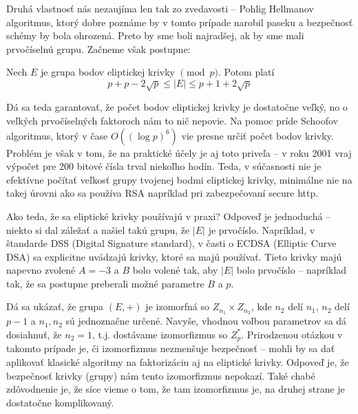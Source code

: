 Druhá vlastnosť nás nezaujíma len tak zo zvedavosti -- Pohlig Hellmanov
algoritmus, ktorý dobre poznáme by v tomto prípade narobil paseku a
bezpečnosť schémy by bola ohrozená. Preto by sme boli najradšej, ak by
sme mali prvočíselnú grupu. Začneme však postupne:

\begin{veta}
    Nech $E$ je grupa bodov eliptickej krivky $\pmod{p}$.
    Potom platí
    \begin{equation*}
        p+p - 2 \sqrt{p} \le |E| \le p + 1 + 2 \sqrt{p}
    \end{equation*}
\end{veta}

Dá sa teda garantovať, že počet bodov eliptickej krivky je dostatočne
veľký, no o veľkých prvočíselných faktoroch nám to nič nepovie.
Na pomoc príde Schoofov algoritmus, ktorý v čase
$O((\log{p})^6)$ vie presne určiť počet bodov krivky. Problém je však
v tom, že na praktické účely je aj toto priveľa -- v roku 2001 vraj
výpočet pre 200 bitové čísla trval niekoľho hodín. Teda, v súčasnosti
nie je efektívne počítať veľkosť grupy tvojenej bodmi eliptickej
krivky, minimálne nie na takej úrovni ako sa používa RSA napríklad pri
zabezpečovaní secure http.

Ako teda, že sa eliptické krivky používajú v praxi? Odpoveď je
jednoduchá -- niekto si dal záležať a našiel takú grupu, že $|E|$ je
prvočíslo. Napríklad, v štandarde DSS (Digital Signature standard), v
časti o ECDSA (Elliptic Curve DSA) sa explicitne uvádzajú krivky,
ktoré sa majú používať. Tieto krivky majú napevno zvolené $A=-3$ a $B$
bolo volené tak, aby $|E|$ bolo prvočíslo -- napríklad tak, že sa
postupne preberali možné parametre $B$ a $p$.

\begin{poznamka}
    Dá sa ukázať, že grupa $(E,+)$ je izomorfná so
    $Z_{n_1} \times Z_{n_2}$, kde $n_2$ delí $n_1$, $n_2$ delí $p-1$ a
    $n_1,n_2$ sú jednoznačne určené.
    Navyše, vhodnou voľbou parametrov sa dá dosiahnuť, že
    $n_2=1$, t.j. dostávame izomorfizmus so $Z_p^*$. Prirodzenou
    otázkou v takomto prípade je, či izomorfizmus nezmenšuje
    bezpečnosť -- mohli by sa dať aplikovať klasické algoritmy na
    faktorizáciu aj na eliptické krivky.
    Odpoveď je, že bezpečnosť krivky (grupy) nám tento izomorfizmus
    nepokazí. Také chabé zdôvodnenie je, že síce vieme o tom, že tam
    izomorfizmus je, na druhej strane je dostatočne komplikovaný.
\end{poznamka}


